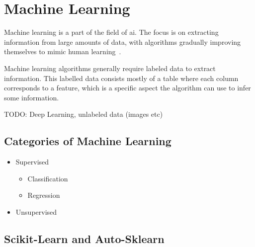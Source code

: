 \section{Machine Learning}
Machine learning is a part of the field of \ac{ai}. The focus is on extracting information from large amounts of data, with algorithms gradually improving themselves to mimic human learning~\cite{what-is-ml}.

Machine learning algorithms generally require labeled data to extract information. This labelled data consists mostly of a table where each column corresponds to a feature, which is a specific aspect the algorithm can use to infer some information. %

TODO\@: Deep Learning, unlabeled data (images etc)
\subsection{Categories of Machine Learning}
\begin{itemize}
  \item Supervised
        \begin{itemize}
          \item Classification
          \item Regression
        \end{itemize}
  \item Unsupervised
\end{itemize}

\subsection{Scikit-Learn and Auto-Sklearn}
